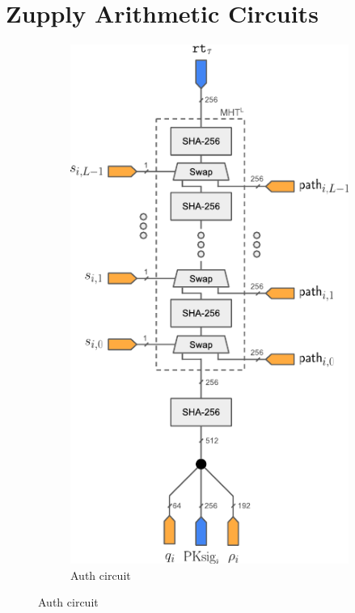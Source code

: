 \section{Zupply Arithmetic Circuits}
\label{sec:Zupply Arithmetic Circuits}

\begin{figure}
    \centering
    \begin{subfigure}[b]{0.35\textwidth}  %
        \centering
        \includegraphics[scale=0.6]{Figures/Auth.pdf} %
        \caption{\textsf{Auth} circuit}
        \label{fig:Authcircuits}
        

\end{subfigure}
\end{figure}
